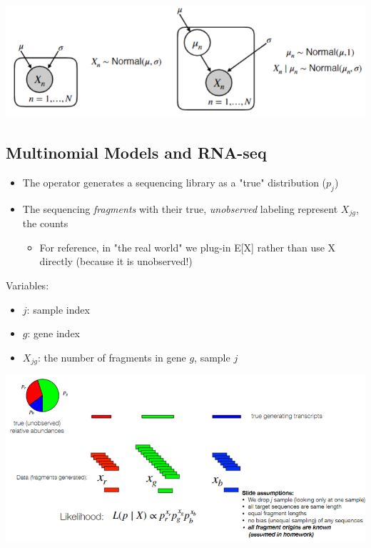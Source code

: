 \documentclass[10pt]{article}
\begin{document}
\begin{center}
    \includegraphics*[scale=1]{W3_6.png}
\end{center}    

\subsection*{Multinomial Models and RNA-seq}
\begin{itemize}
    \item The operator generates a sequencing library as a "true" distribution ($p_j$)
    \item The sequencing \textit{fragments} with their true, \textit{unobserved} labeling represent $X_{jg}$, the counts
    \begin{itemize}
        \item For reference, in "the real world" we plug-in E[X] rather than use X directly (because it is unobserved!)
    \end{itemize}
\end{itemize}   
Variables:
\begin{itemize}
    \item $j$: sample index
    \item $g$: gene index
    \item $X_{jg}$: the number of fragments in gene $g$, sample $j$
\end{itemize}
\begin{center}
    \includegraphics*[scale=0.9]{W3_7.png}
\end{center}
\end{document}
